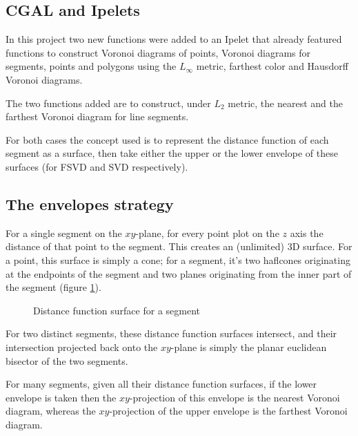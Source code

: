 \documentclass[11pt,a4paper,english]{article}
\begin{document}
	\subsection{CGAL and Ipelets}
	
	In this project two new functions were added to an Ipelet that already featured functions to construct Voronoi diagrams of points, Voronoi diagrams for segments, points and polygons using the \(L_{\infty}\) metric, farthest color and Hausdorff Voronoi diagrams.\par
	The two functions added are to construct, under \(L_{2}\) metric, the nearest and the farthest Voronoi diagram for line segments.\par
	For both cases the concept used is to represent the distance function of each segment as a surface, then take either the upper or the lower envelope of these surfaces (for FSVD and SVD respectively).
	
	\subsection{The envelopes strategy}
	For a single segment on the \(xy\)-plane, for every point plot on the \(z\) axis the distance of that point to the segment. This creates an (unlimited) 3D surface. For a point, this surface is simply a cone; for a segment, it's two haflcones originating at the endpoints of the segment and two planes originating from the inner part of the segment (figure \ref{fig:distance_function}).\par
	\begin{figure}[h]
    \centering
    \caption{Distance function surface for a segment\protect\footnotemark \label{fig:distance_function}}
	\end{figure}
	For two distinct segments, these distance function surfaces intersect, and their intersection projected back onto the \(xy\)-plane is simply the planar euclidean bisector of the two segments.\par
	For many segments, given all their distance function surfaces, if the lower envelope is taken then the \(xy\)-projection of this envelope is the nearest Voronoi diagram, whereas the \(xy\)-projection of the upper envelope is the farthest Voronoi diagram.
	
\end{document}
